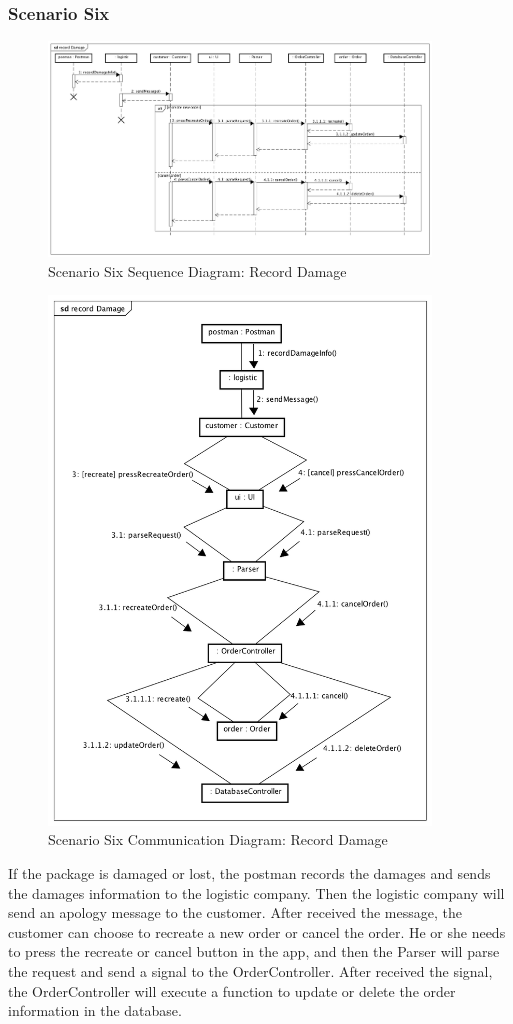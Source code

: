 \documentclass[12pt]{scrreprt}
\begin{document}
\subsubsection{Scenario Six}
\begin{figure}[H]
  \centering\includegraphics[width=4in]{DocumentRes/6SequenceDiagram_recordDamage.png}
  \caption{Scenario Six Sequence Diagram: Record Damage}
\end{figure}
\begin{figure}[H]
  \centering\includegraphics[width=4in]{DocumentRes/6CommunicationDiagram_recordDamage.png}
  \caption{Scenario Six Communication Diagram: Record Damage}
\end{figure}
If the package is damaged or lost, the postman records the damages and sends the damages information to the logistic company. Then the logistic company will send an apology  message to the customer. After received the message, the customer can choose to recreate a new order or cancel the order. He or she needs to press the recreate or cancel button in the app, and then the Parser will parse the request and send a signal to the OrderController. After received the signal, the OrderController will execute a function to update or delete the order information in the database.
\end{document}

